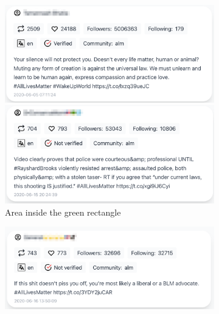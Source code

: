 \begin{figure}[H]
\begin{subfigure}{.5\textwidth}
  \centering
  \captionsetup{justification=centering}
  \includegraphics[width=1\linewidth]{Report-latex/tex_files/pics/example/obser4.png}  
  
  
  \includegraphics[width=1\linewidth]{Report-latex/tex_files/pics/example/obser5.png} 
 \caption{Area inside the green rectangle}
  \label{fig:sub-third}
\end{subfigure}
\begin{subfigure}{.5\textwidth}
  \centering
  \captionsetup{justification=centering}
  \includegraphics[width=1\linewidth]{Report-latex/tex_files/pics/example/obser6.png}
  

\end{subfigure}
\end{figure}
